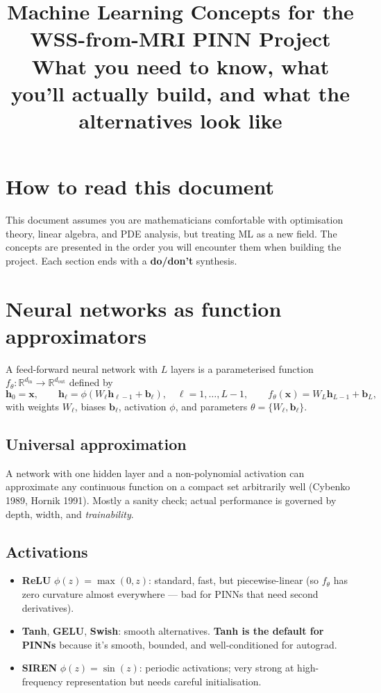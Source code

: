 \documentclass[11pt]{article}
\title{\bfseries Machine Learning Concepts for the WSS-from-MRI PINN Project\\[0.3em]
\large What you need to know, what you'll actually build, and what the alternatives look like}
\author{}
\date{}
\begin{document}
\maketitle

\section*{How to read this document}
This document assumes you are mathematicians comfortable with optimisation theory, linear algebra, and PDE analysis, but treating ML as a new field. The concepts are presented in the order you will encounter them when building the project. Each section ends with a \textbf{do/don't} synthesis.

\section{Neural networks as function approximators}

A feed-forward neural network with $L$ layers is a parameterised function $f_\theta: \mathbb{R}^{d_{\text{in}}} \to \mathbb{R}^{d_{\text{out}}}$ defined by
\[
\mathbf{h}_0 = \mathbf{x}, \qquad
\mathbf{h}_\ell = \phi(W_\ell \mathbf{h}_{\ell-1} + \mathbf{b}_\ell), \quad \ell = 1,\dots,L-1, \qquad
f_\theta(\mathbf{x}) = W_L \mathbf{h}_{L-1} + \mathbf{b}_L,
\]
with weights $W_\ell$, biases $\mathbf{b}_\ell$, activation $\phi$, and parameters $\theta = \{W_\ell, \mathbf{b}_\ell\}$.

\subsection*{Universal approximation}
A network with one hidden layer and a non-polynomial activation can approximate any continuous function on a compact set arbitrarily well (Cybenko 1989, Hornik 1991). Mostly a sanity check; actual performance is governed by depth, width, and \emph{trainability}.

\subsection*{Activations}
\begin{itemize}[noitemsep]
\item \textbf{ReLU} $\phi(z) = \max(0,z)$: standard, fast, but piecewise-linear (so $f_\theta$ has zero curvature almost everywhere --- bad for PINNs that need second derivatives).
\item \textbf{Tanh}, \textbf{GELU}, \textbf{Swish}: smooth alternatives. \textbf{Tanh is the default for PINNs} because it's smooth, bounded, and well-conditioned for autograd.
\item \textbf{SIREN} $\phi(z) = \sin(z)$: periodic activations; very strong at high-frequency representation but needs careful initialisation.
\end{itemize}
\end{document}
